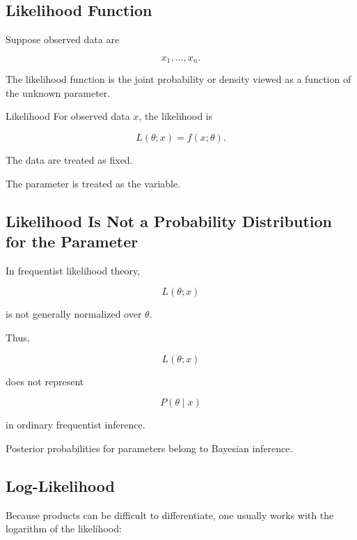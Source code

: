 \subsection{Likelihood Function}
\label{subsec:likelihood-function}

Suppose observed data are

\[
x_1,\ldots,x_n.
\]

The likelihood function is the joint probability or density viewed as a
function of the unknown parameter.

\begin{definitionbox}{Likelihood}
For observed data \(x\), the likelihood is

\[
\boxed{
L(\theta;x)
=
f(x;\theta).
}
\]
\end{definitionbox}

The data are treated as fixed.

The parameter is treated as the variable.

\subsection{Likelihood Is Not a Probability Distribution for the Parameter}
\label{subsec:likelihood-not-probability}

In frequentist likelihood theory,

\[
L(\theta;x)
\]

is not generally normalized over \(\theta\).

Thus,

\[
\boxed{
L(\theta;x)
}
\]

does not represent

\[
P(\theta\mid x)
\]

in ordinary frequentist inference.

Posterior probabilities for parameters belong to Bayesian inference.

\subsection{Log-Likelihood}
\label{subsec:log-likelihood}

Because products can be difficult to differentiate, one usually works
with the logarithm of the likelihood:

